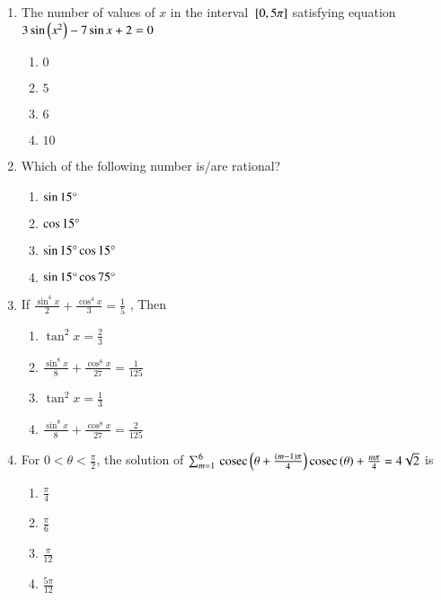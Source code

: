 \begin{enumerate}[label=\thesubsection.\arabic*,ref=\thesubsection.\theenumi]
\begin{enumerate}
\end{enumerate}
\item The number of values of $x$ in the interval ${}\left[0,5\pi\right]$ satisfying equation 
$3 \sin{\ensuremath{\left(x^2\right)}}-7 \sin{x+2}=0$  \hfill{} 
\begin{enumerate}
    \item $0$
    \item $5$
    \item $6$
    \item $10$
\end{enumerate}

\item Which of the following number is/are rational? \hfill{} 
\begin{enumerate}
    \item $\sin{15}\degree$
    \item $\cos{15}\degree$
    \item $\sin{15}\degree \cos{15}\degree$
    \item $\sin{15}\degree \cos{75}\degree$
\end{enumerate}
\item If $\frac{\sin^4{x}}{2}+\frac{\cos^4{x}}{3}=\frac{1}{5}$ , Then \hfill{} 
\begin{enumerate}
    \item $\tan^2{x}=\frac{2}{3}$
    \item $\frac{\sin^8{x}}{8}+\frac{\cos^8{x}}{27}=\frac{1}{125}$
    \item $\tan^2{x}=\frac{1}{3}$
    \item $\frac{\sin^8{x}}{8}+\frac{\cos^8{x}}{27}=\frac{2}{125}$
\end{enumerate}
\item For $ 0<\theta <\frac{\pi}{2}$, the solution of $\sum_{m=1}^{6}\,\text{cosec}\,{\left(\theta+\frac{\left(m-1\right)\pi}{4}\right)}\,\text{cosec}\,{{\left(\theta\right)+\frac{m\pi}{4}} }= 4\sqrt{2}$ is \hfill{}
\begin{enumerate}
    \item $\frac{\pi}{4}$
    \item $\frac{\pi}{6}$
    \item $\frac{\pi}{12}$
    \item $\frac{5\pi}{12}$
\end{enumerate}


\end{enumerate}
